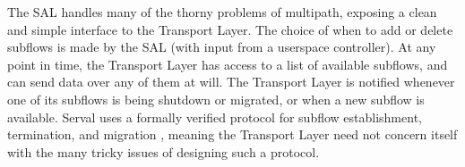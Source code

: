 The SAL handles many of the thorny problems of multipath, exposing a clean and simple interface to the Transport Layer. The choice of when to add or delete subflows is made by the SAL (with input from a userspace controller). At any point in time, the Transport Layer has access to a list of available subflows, and can send data over any of them at will. The Transport Layer is notified whenever one of its subflows is being shutdown or migrated, or when a new subflow is available. Serval uses a formally verified protocol for subflow establishment, termination, and migration \cite{arye2012formally}, meaning the Transport Layer need not concern itself with the many tricky issues of designing such a protocol.

